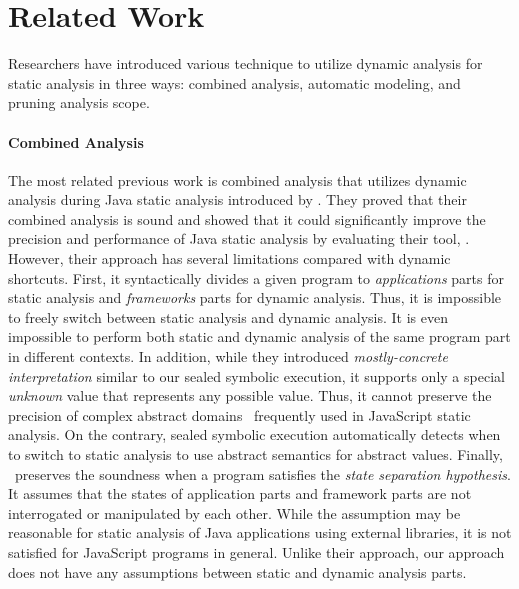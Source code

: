 \section{Related Work}\label{sec:related}
Researchers have introduced various technique to utilize dynamic
analysis for static analysis in three ways: combined analysis,
automatic modeling, and pruning analysis scope.


\paragraph{Combined Analysis}
The most related previous work is combined analysis that utilizes dynamic
analysis during Java static analysis introduced by \citet{concerto}.
They proved that their combined analysis is sound and showed that it could
significantly improve the precision and performance of Java static analysis by
evaluating their tool, \concerto.  However, their approach has several
limitations compared with dynamic shortcuts.  First, it syntactically
divides a given program to \textit{applications} parts for static
analysis and \textit{frameworks} parts for dynamic analysis.  Thus, it is impossible to
freely switch between static analysis and dynamic analysis.  It is
even impossible to perform both static and dynamic analysis of 
the same program part in different contexts.  In addition, while they
introduced \textit{mostly-concrete interpretation} similar to our
sealed symbolic execution, it supports only a special \textit{unknown}
value that represents any possible value.  Thus, it cannot preserve
the precision of complex abstract domains~\cite{revisit-recency,
  regex, weaklySPE} frequently used in JavaScript static analysis.
On the contrary, sealed symbolic execution automatically detects when
to switch to static analysis to use abstract semantics for abstract values.
Finally, \concerto\ preserves the soundness when a program satisfies
the \textit{state separation hypothesis}.  It assumes that the states
of application parts and framework parts are not interrogated
or manipulated by each other.  While the assumption may be reasonable
for static analysis of Java applications using external libraries, it
is not satisfied for JavaScript programs in general.  Unlike their
approach, our approach does not have any assumptions between static and
dynamic analysis parts.


